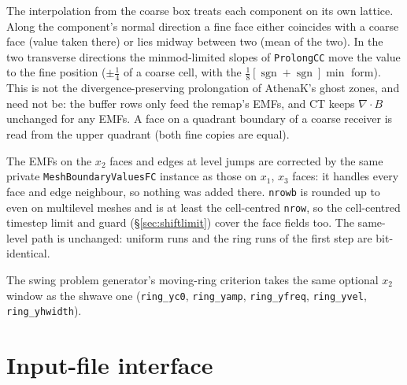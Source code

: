 \documentclass[11pt]{article}
\newcommand{\code}[1]{\texttt{#1}}
\newcommand{\fn}[1]{\texttt{\small #1}}
\begin{document}
\noindent
The interpolation from the coarse box treats each component on its own lattice. Along the
component's normal direction a fine face either coincides with a coarse face (value taken
there) or lies midway between two (mean of the two). In the two transverse directions the
minmod-limited slopes of \fn{ProlongCC} move the value to the fine position ($\pm\frac14$
of a coarse cell, with the $\frac18[\operatorname{sgn}+\operatorname{sgn}]\min$ form).
This is not the divergence-preserving prolongation of AthenaK's ghost zones, and need not
be: the buffer rows only feed the remap's EMFs, and CT keeps $\nabla\!\cdot\!B$ unchanged for
any EMFs. A face on a quadrant boundary of a coarse receiver is read from the upper
quadrant (both fine copies are equal).

The EMFs on the $x_2$ faces and edges at level jumps are corrected by the same private
\fn{MeshBoundaryValuesFC} instance as those on $x_1$, $x_3$ faces: it handles every face
and edge neighbour, so nothing was added there. \code{nrowb} is rounded up to even on
multilevel meshes and is at least the cell-centred \code{nrow}, so the cell-centred
timestep limit and guard (\S\ref{sec:shiftlimit}) cover the face fields too. The same-level
path is unchanged: uniform runs and the ring runs of the first step are bit-identical.

The swing problem generator's moving-ring criterion takes the same optional $x_2$ window
as the shwave one (\code{ring\_yc0}, \code{ring\_yamp}, \code{ring\_yfreq},
\code{ring\_yvel}, \code{ring\_yhwidth}).

\section{Input-file interface}
\label{sec:inputs}
\end{document}
